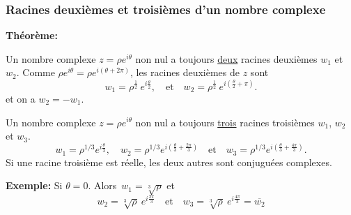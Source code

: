 

\begin{frame}
\frametitle{\bf Racines deuxièmes et troisièmes d'un nombre complexe} 
\medskip 

{\bf Théorème:} 
\begin{itemize}
\bitem
Un nombre complexe $z=\rho e^{i\theta}$ non nul a toujours \underline{deux} {racines deuxièmes} 
$w_1$ et $w_2$.
Comme $\rho e^{i\theta}=\rho e^{i(\theta+2\pi)}$, les  racines deuxièmes de $z$ sont
$$\boxed{w_1={\rho^{\frac12}}\ e^{i\frac{\theta}{2}},\quad\text{et}\quad w_2=\rho^{\frac12}\ e^{i\left(\frac{\theta}{2}+\pi\right)} }.$$
et on a $\boxed{w_2=-w_1}$.

\hfill
{}
\vspace*{3mm}

\pause
\bitem
Un nombre complexe $z=\rho e^{i\theta}$ non nul a toujours \underline{trois} { racines troisièmes} 
$w_1$, $w_2$ et $w_3$.
$$\boxed{w_1=\rho^{1/3} e^{i\frac{\theta}{3}}, \quad w_2=\rho^{1/3} e^{i(\frac{\theta}{3}+\frac{2\pi}{3})}\quad\text{et}\quad w_3=\rho^{1/3} e^{i(\frac{\theta}{3}+\frac{4\pi}{3})} }.$$
Si une racine troisième est r\'eelle, les deux autres sont conjugu\'ees 
complexes.  
\hfill
\parbox[t]{5.7cm}{
{\small 
{\bf Exemple:} Si $\theta=0$. Alors\ $w_1=\sqrt[3]{\rho}$ et
$$ 
w_2=\sqrt[3]{\rho}\ e^{i\frac{2\pi}{3}}\quad \mbox{et}\quad  
w_3=\sqrt[3]{\rho}\ e^{i\frac{4\pi}{3}}=\overline{w_2}
$$}}
\quad
{}

\end{itemize}

\end{frame}

